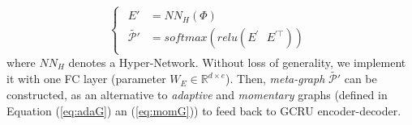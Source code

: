 \documentclass[letterpaper]{article} \usepackage{aaai23}  \usepackage{times}  \usepackage{helvet}  \usepackage{courier}  \usepackage[hyphens]{url}  \usepackage{graphicx} \urlstyle{rm} \def\UrlFont{\rm}  \usepackage{natbib}  \usepackage{caption} \usepackage{multirow}
\begin{document}
\begin{equation} \label{eq:hyper-node}
	\begin{cases}
	\begin{aligned}
		E' & = \textit{NN}_H(\Phi)     \\
		\tilde{\mathcal{P}'} & = softmax(relu(E^{'} \textit{ } E^{'\top}))
	\end{aligned}
	\end{cases}
\end{equation}
where $\textit{NN}_H$ denotes a Hyper-Network. Without loss of generality, we implement it with one FC layer (parameter $W_E \in \mathbb{R}^{d \times e}$). Then, \textit{meta-graph} $\tilde{\mathcal{P}'}$ can be constructed, as an alternative to \textit{adaptive} and \textit{momentary} graphs (defined in Equation (\ref{eq:adaG}) an (\ref{eq:momG})) to feed back to GCRU encoder-decoder. 
\end{document}
